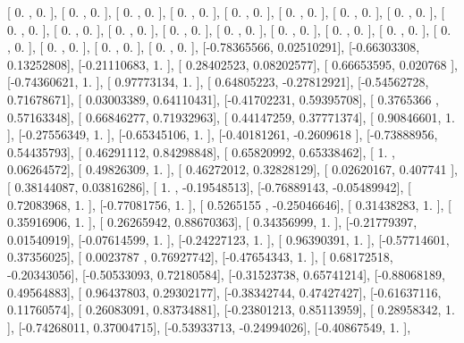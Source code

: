 \documentclass{article}
\begin{document}
       [ 0.        ,  0.        ],
       [ 0.        ,  0.        ],
       [ 0.        ,  0.        ],
       [ 0.        ,  0.        ],
       [ 0.        ,  0.        ],
       [ 0.        ,  0.        ],
       [ 0.        ,  0.        ],
       [ 0.        ,  0.        ],
       [ 0.        ,  0.        ],
       [ 0.        ,  0.        ],
       [ 0.        ,  0.        ],
       [ 0.        ,  0.        ],
       [ 0.        ,  0.        ],
       [ 0.        ,  0.        ],
       [ 0.        ,  0.        ],
       [ 0.        ,  0.        ],
       [ 0.        ,  0.        ],
       [ 0.        ,  0.        ],
       [ 0.        ,  0.        ],
       [ 0.        ,  0.        ],
       [-0.78365566,  0.02510291],
       [-0.66303308,  0.13252808],
       [-0.21110683,  1.        ],
       [ 0.28402523,  0.08202577],
       [ 0.66653595,  0.020768  ],
       [-0.74360621,  1.        ],
       [ 0.97773134,  1.        ],
       [ 0.64805223, -0.27812921],
       [-0.54562728,  0.71678671],
       [ 0.03003389,  0.64110431],
       [-0.41702231,  0.59395708],
       [ 0.3765366 ,  0.57163348],
       [ 0.66846277,  0.71932963],
       [ 0.44147259,  0.37771374],
       [ 0.90846601,  1.        ],
       [-0.27556349,  1.        ],
       [-0.65345106,  1.        ],
       [-0.40181261, -0.2609618 ],
       [-0.73888956,  0.54435793],
       [ 0.46291112,  0.84298848],
       [ 0.65820992,  0.65338462],
       [ 1.        ,  0.06264572],
       [ 0.49826309,  1.        ],
       [ 0.46272012,  0.32828129],
       [ 0.02620167,  0.407741  ],
       [ 0.38144087,  0.03816286],
       [ 1.        , -0.19548513],
       [-0.76889143, -0.05489942],
       [ 0.72083968,  1.        ],
       [-0.77081756,  1.        ],
       [ 0.5265155 , -0.25046646],
       [ 0.31438283,  1.        ],
       [ 0.35916906,  1.        ],
       [ 0.26265942,  0.88670363],
       [ 0.34356999,  1.        ],
       [-0.21779397,  0.01540919],
       [-0.07614599,  1.        ],
       [-0.24227123,  1.        ],
       [ 0.96390391,  1.        ],
       [-0.57714601,  0.37356025],
       [ 0.0023787 ,  0.76927742],
       [-0.47654343,  1.        ],
       [ 0.68172518, -0.20343056],
       [-0.50533093,  0.72180584],
       [-0.31523738,  0.65741214],
       [-0.88068189,  0.49564883],
       [ 0.96437803,  0.29302177],
       [-0.38342744,  0.47427427],
       [-0.61637116,  0.11760574],
       [ 0.26083091,  0.83734881],
       [-0.23801213,  0.85113959],
       [ 0.28958342,  1.        ],
       [-0.74268011,  0.37004715],
       [-0.53933713, -0.24994026],
       [-0.40867549,  1.        ],
\end{document}
